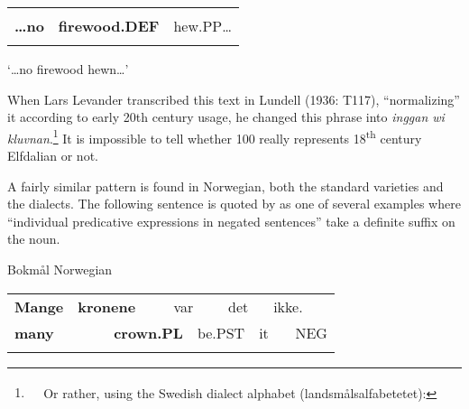 \begin{tabular}{lll}
\lsptoprule
\multicolumn{3}{l}{{\bfseries …ingan}

}\\
{\bfseries …no} & {\bfseries firewood.DEF} & hew.PP…\\
\lspbottomrule
\end{tabular}

\begin{styleTranslation}
‘…no firewood hewn…’

\end{styleTranslation}

\begin{styleBodytextC}
When Lars Levander transcribed this text in Lundell (1936: T117), “normalizing” it according to early 20th century usage, he changed this phrase into \textit{inggan wi kluvnan}.\footnote{\textsuperscript{\ \ } Or rather, using the Swedish dialect alphabet (landsmålsalfabetetet):  }\textit{ }It is impossible to tell whether 100 really represents 18\textsuperscript{th} century Elfdalian or not. 

\end{styleBodytextC}

\begin{styleBodytextC}
A fairly similar pattern is found in Norwegian, both the standard varieties and the dialects. The following sentence is quoted by \citet[302]{FaarlundEtAl1997} as one of several examples where “individual predicative expressions in negated sentences” take a definite suffix on the noun. 

\end{styleBodytextC}

\begin{listWWNumileveli}
\item 

\begin{styleExample}
Bokmål Norwegian 

\end{styleExample}

\end{listWWNumileveli}

\begin{tabular}{llllllllll}
\lsptoprule
{\bfseries Mange} & \multicolumn{2}{l}{{\bfseries kronene}

} & \multicolumn{2}{l}{var

} & \multicolumn{2}{l}{det

} & \multicolumn{2}{l}{ikke.

} & \\
\multicolumn{2}{l}{{\bfseries many}

} & \multicolumn{2}{l}{{\bfseries crown.PL}

} & \multicolumn{2}{l}{be.PST

} & \multicolumn{2}{l}{it

} & \multicolumn{2}{l}{NEG

}\\
\lspbottomrule
\end{tabular}

